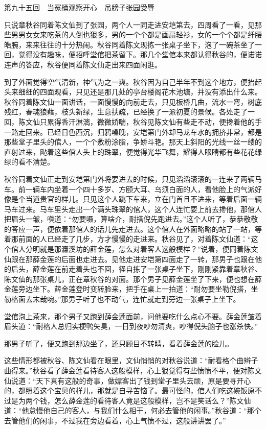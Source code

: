 \documentclass[12pt,UTF8]{ctexbook}
\begin{document}
{{{第九十五回　当冤桶观察开心　吊膀子张园受辱





只说章秋谷同着陈文仙到了张园，两个人一同走进安垲第去，四周看了一看，见那些男男女女来吃茶的人倒也狠多，男的一个个都是画扇轻衫，女的一个个都是纤腰皓腕，来来往往的十分热闹。秋谷同着陈文现拣一张桌子坐下，泡了一碗茶坐了一回，觉得没有趣味，便招呼堂倌把茶留下。那几个堂倌本来都认得秋谷的，便诺诺连声的答应，秋谷便同着陈文仙走出来四面闲逛。

到了外面觉得空气清新，神气为之一爽。秋谷因为自己半年不到这个地方，便抬起头来细细的四面观看，只见还是那几处的亭台楼阁花木池塘，并没有添出什么来。秋谷同着陈文仙一面讲话，一面慢慢的向前走去，只见板桥几曲，流水一弯，树底残红，春魂狼藉，枝头新绿，生意扶疏，已经换了一派初夏的景候。各处走了一回，陈文仙只累得香汗淋漓，微微娇喘，秋谷见陈文仙有些走不动，便搀着他的手一路走回来。已经日色西沉，归鸦噪晚，安垲第门外却马龙车水的拥挤非常，都是那些堂子里头的倌人，一个个敷粉涂脂，争娇斗艳。那天上斜阳的光线一丝一缕的直射过来，飐着这些倌人头上的珠翠，便觉得光华飞舞，耀得人眼睛都有些花花绿绿的看不清楚。

秋谷同着文仙正走到安垲第门外将要进去的时候，只见滔滔滚滚的一连来了两辆马车。前一辆车内坐着一个四十多岁、方颐大耳、乌须白面的人，看他脸上的气派好像是个当道贵官的样儿。只见这个人跳下车来，立在门首且不进来，等着后面一辆马车过来。马车里头走出一个满头珠翠的倌人，这个人连忙要上前去搀他，那倌人把眉头一皱，嗔道：“勿要嗫，算啥介，耐搭倪先跑进去。”这个人听了，恭恭敬敬的答应一声，便依着那倌人的话儿先走进去。这个倌人在外面略略的站了一站，等着那前面的人已经走了几步，方才慢慢的走进来。秋谷见了，对着陈文仙道：“这个倌人分明就是那濂溪坊的薛金莲，怎么对着客人这般模样？”说着，便同着陈文仙跟在那薛金莲的后面也走进去。见他走进安垲第四面走了一转，那男子也跟在他的后头，薛金莲在前走着头也不回，径自拣了一张桌子坐下，刚刚紧靠着章秋谷、陈文仙的那张桌儿，正在章秋谷的对面。那个男子见薛金莲坐了下来，便也想在薛金莲旁边坐下。薛金莲登时变转脸来，把手在桌上一拍道：“耐勿要坐勒倪搭，坐勒格面去末哉啘。”那男子听了也不动气，连忙就走到旁边一张桌子上坐下。

堂倌泡上茶来，那个男子又跑到薛金莲面前，问他要吃什么点心不要。薛金莲皱着眉头道：“耐格人总归实梗鸭矢臭，一日到夜吵勿清爽，吵得倪头脑子也涨杀快。”

那男子听了，便又跑到那边坐了，还只顾目不转睛，看着薛金莲的脸儿。

这些情形都被秋谷、陈文仙看在眼里，文仙悄悄的对秋谷说道：“耐看格个曲辫子曲得来。”秋谷看了薛金莲看待客人这般模样，心上狠觉得有些愤愤不平，便对陈文仙说道：“天下真有这般的奇事，做嫖客出了钱到堂子里头去顽，原是要寻开心的，都照着这个宝贝的样儿，那就是自寻苦恼了。最可怪的，倌人们吃这碗饭原不过是为两个钱，怎么薛金莲的看待客人竟是这般模样，岂不是笑话么？”陈文仙道：“他怠慢他自己的客人，与我们什么相干，何必去管他的闲事。”秋谷道：“那个去管他们的闲事，不过我在旁边看着，心上气愤不过，这般讲讲罢了。”

}}}
\end{document}
